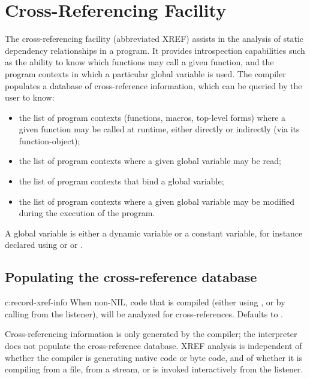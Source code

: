 \chapter{Cross-Referencing Facility}
\label{xref}

The \cmucl{} cross-referencing facility (abbreviated XREF) assists in
the analysis of static dependency relationships in a program. It
provides introspection capabilities such as the ability to know which
functions may call a given function, and the program contexts in which
a particular global variable is used. The compiler populates a
database of cross-reference information, which can be queried by the
user to know:

\begin{itemize}
\item
the list of program contexts (functions, macros, top-level forms)
where a given function may be called at runtime, either directly or
indirectly (via its function-object);

\item
the list of program contexts where a given global variable may be
read;

\item
the list of program contexts that bind a global variable;

\item
the list of program contexts where a given global variable may be
modified during the execution of the program.
\end{itemize}

A global variable is either a dynamic variable or a constant variable,
for instance declared using  or  or
.


\section{Populating the cross-reference database}

\begin{defvar}{c:}{record-xref-info}
   When non-NIL, code that is compiled (either using
   , or by calling  from the
   listener), will be analyzed for cross-references. Defaults to
   \nil{}.
\end{defvar}

Cross-referencing information is only generated by the compiler; the
interpreter does not populate the cross-reference database. XREF
analysis is independent of whether the compiler is generating native
code or byte code, and of whether it is compiling from a file, from a
stream, or is invoked interactively from the listener. 

